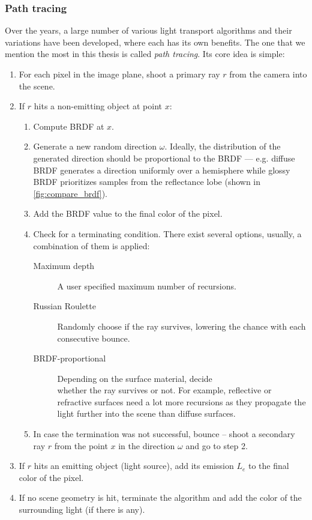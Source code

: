 \subsubsection{Path tracing}
Over the years, a large number of various light transport algorithms and their variations have been developed, where each has its own benefits. The one that we mention the most in this thesis is called \emph{path tracing}. Its core idea is simple:

\renewcommand{\labelenumii}{\theenumii}
\renewcommand{\theenumii}{\theenumi.\arabic{enumii}.}
\begin{enumerate}
	\item For each pixel in the image plane, shoot a primary ray $r$ from the camera into the scene.
	\item If $r$ hits a non-emitting object at point $x$:
	\begin{enumerate}
		\item Compute BRDF at $x$.
		\item Generate a new random direction $\omega$. Ideally, the distribution of the generated direction should be proportional to the BRDF --- e.g. diffuse BRDF generates a direction uniformly over a hemisphere while glossy BRDF prioritizes samples from the reflectance lobe (shown in \autoref{fig:compare_brdf}).
		\item Add the BRDF value to the final color of the pixel.
		\item Check for a terminating condition. There exist several options, usually, a combination of them is applied:
			\begin{description}
				\item [Maximum depth] A user specified maximum number of recursions.
				\item [Russian Roulette] Randomly choose if the ray survives, lowering the chance with each consecutive bounce.
				\item [BRDF-proportional] Depending on the surface material, decide \\ whether the ray survives or not. For example, reflective or refractive surfaces need a lot more recursions as they propagate the light further into the scene than diffuse surfaces.
			\end{description}
		\item In case the termination was not successful, bounce -- shoot a secondary ray $r$ from the point $x$ in the direction $\omega$ and go to step 2.
	\end{enumerate}
	\item If $r$ hits an emitting object (light source), add its emission $L_e$ to the final color of the pixel.
	\item If no scene geometry is hit, terminate the algorithm and add the color of the surrounding light (if there is any).
\end{enumerate}

